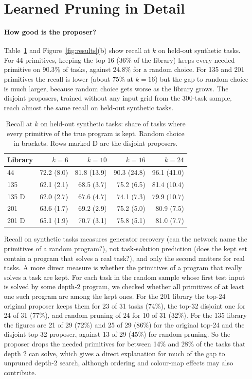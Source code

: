 \documentclass[sigconf,nonacm]{acmart}
\begin{document}
\section{Learned Pruning in Detail}\label{app:pruning}

\paragraph{How good is the proposer?}\label{sec:recall}

Table~\ref{tab:recall} and Figure~\ref{fig:results}(b) show recall at $k$ on held-out synthetic tasks. For 44 primitives, keeping the top 16 (36\% of the library) keeps every needed primitive on 90.3\% of tasks, against 24.8\% for a random choice. For 135 and 201 primitives the recall is lower (about 75\% at $k=16$) but the gap to random choice is much larger, because random choice gets worse as the library grows. The disjoint proposers, trained without any input grid from the 300-task sample, reach almost the same recall on held-out synthetic tasks.

\begin{table}[t]
\caption{Recall at $k$ on held-out synthetic tasks: share of tasks where every primitive of the true program is kept. Random choice in brackets. Rows marked D are the disjoint proposers.}
\label{tab:recall}
\small
\begin{tabular}{@{}lrrrr@{}}
\toprule
Library & $k=6$ & $k=10$ & $k=16$ & $k=24$ \\
\midrule
44  & 72.2 (8.0)  & 81.8 (13.9) & 90.3 (24.8) & 96.1 (41.0) \\
135 & 62.1 (2.1)  & 68.5 (3.7)  & 75.2 (6.5)  & 81.4 (10.4) \\
135 D & 62.0 (2.7) & 67.6 (4.7) & 74.1 (7.3) & 79.9 (10.7) \\
201 & 63.6 (1.7)  & 69.2 (2.9)  & 75.2 (5.0)  & 80.9 (7.5)  \\
201 D & 65.1 (1.9) & 70.7 (3.1) & 75.8 (5.1) & 81.0 (7.7) \\
\bottomrule
\end{tabular}
\end{table}

Recall on synthetic tasks measures generator recovery (can the network name the primitives of a random program?), not task-solution prediction (does the kept set contain a program that solves a real task?), and only the second matters for real tasks. A more direct measure is whether the primitives of a program that really solves a task are kept. For each task in the random sample whose first test input is solved by some depth-2 program, we checked whether all primitives of at least one such program are among the kept ones. For the 201 library the top-24 original proposer keeps them for 23 of 31 tasks (74\%), the top-32 disjoint one for 24 of 31 (77\%), and random pruning of 24 for 10 of 31 (32\%). For the 135 library the figures are 21 of 29 (72\%) and 25 of 29 (86\%) for the original top-24 and the disjoint top-32 proposer, against 13 of 29 (45\%) for random pruning. So the proposer drops the needed primitives for between 14\% and 28\% of the tasks that depth 2 can solve, which gives a direct explanation for much of the gap to unpruned depth-2 search, although ordering and colour-map effects may also contribute.
\end{document}
